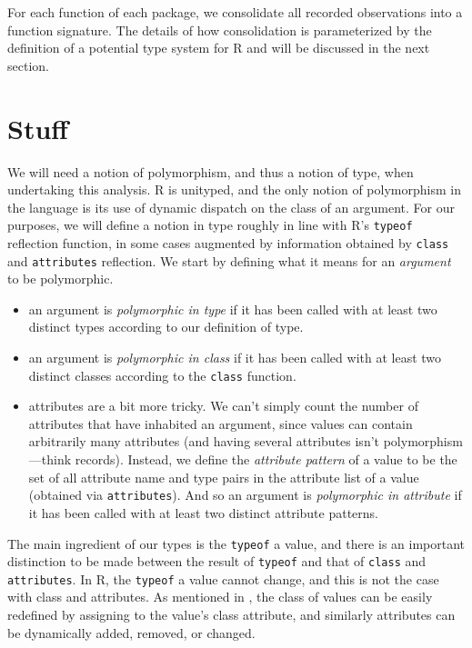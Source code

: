 \documentclass[acmsmall,10pt,review,anonymous]{acmart}\settopmatter{printfolios=true,printccs=false,printacmref=false}
\newcommand{\code}[1]{\lstinline|#1|\xspace}
\begin{document}
For each function of each package, we consolidate all recorded observations
into a function signature. The details of how consolidation is parameterized
by the definition of a potential type system for R and will be discussed in
the next section.

\section{Stuff}

We will need a notion of polymorphism, and thus a notion of type, when undertaking this analysis. 
R is unityped, and the only notion of polymorphism in the language is its use of dynamic dispatch on the class of an argument.  
For our purposes, we will define a notion in type roughly in line with R's \code{typeof} reflection function, in some cases augmented by information obtained by \code{class} and \code{attributes} reflection.
We start by defining what it means for an {\it argument} to be polymorphic. 

\begin{itemize}
  \item an argument is {\it polymorphic in type} if it has been called with at
  least two distinct types according to our definition of type.
  
   \item an argument is {\it polymorphic in class} if it has been called with at least two distinct classes according to the \code{class} function.
	
  \item attributes are a bit more tricky.  We can't simply count the number of
  attributes that have inhabited an argument, since values can contain
  arbitrarily many attributes (and having several attributes isn't
  polymorphism---think records).  Instead, we define the {\it attribute
    pattern} of a value to be the set of all attribute name and type pairs
  in the attribute list of a value (obtained via \code{attributes}).  And so
  an argument is {\it polymorphic in attribute} if it has been called with
  at least two distinct attribute patterns.

\end{itemize}

The main ingredient of our types is the {\tt typeof} a value, and there is an important distinction to be made between the result of \code{typeof} and that of \code{class} and \code{attributes}.
In R, the \code{typeof} a value cannot change, and this is not the case with class and attributes.  
As mentioned in , the class of values can be easily redefined by assigning to the value's class attribute, and similarly attributes can be dynamically added, removed, or changed.
\end{document}
